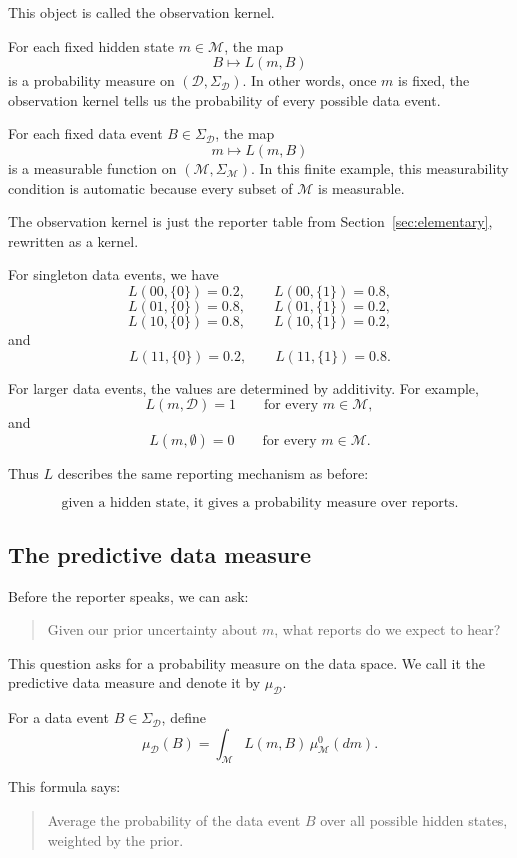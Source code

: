 \documentclass[11pt]{article}
\newcommand{\M}{\mathcal{M}}
\newcommand{\D}{\mathcal{D}}
\newcommand{\SigmaM}{\Sigma_{\M}}
\newcommand{\SigmaD}{\Sigma_{\D}}
\newcommand{\muMzero}{\mu^0_{\M}}
\newcommand{\muD}{\mu_{\D}}
\begin{document}
This object is called the observation kernel.

For each fixed hidden state \(m\in\M\), the map
\[
    B\longmapsto L(m,B)
\]
is a probability measure on \((\D,\SigmaD)\). In other words, once \(m\) is fixed, the observation kernel tells us the probability of every possible data event.

For each fixed data event \(B\in\SigmaD\), the map
\[
    m\longmapsto L(m,B)
\]
is a measurable function on \((\M,\SigmaM)\). In this finite example, this measurability condition is automatic because every subset of \(\M\) is measurable.

The observation kernel is just the reporter table from Section~\ref{sec:elementary}, rewritten as a kernel.

For singleton data events, we have
\[
    L(00,\{0\})=0.2,
    \qquad
    L(00,\{1\})=0.8,
\]
\[
    L(01,\{0\})=0.8,
    \qquad
    L(01,\{1\})=0.2,
\]
\[
    L(10,\{0\})=0.8,
    \qquad
    L(10,\{1\})=0.2,
\]
and
\[
    L(11,\{0\})=0.2,
    \qquad
    L(11,\{1\})=0.8.
\]

For larger data events, the values are determined by additivity. For example,
\[
    L(m,\D)=1
    \qquad
    \text{for every }m\in\M,
\]
and
\[
    L(m,\emptyset)=0
    \qquad
    \text{for every }m\in\M.
\]

Thus \(L\) describes the same reporting mechanism as before:

\[
    \text{given a hidden state, it gives a probability measure over reports.}
\]

\subsection{The predictive data measure}

Before the reporter speaks, we can ask:

\begin{quote}
    Given our prior uncertainty about \(m\), what reports do we expect to hear?
\end{quote}

This question asks for a probability measure on the data space. We call it the predictive data measure and denote it by \(\muD\).

For a data event \(B\in\SigmaD\), define
\[
    \muD(B)
    =
    \int_{\M} L(m,B)\,\muMzero(dm).
\]

This formula says:

\begin{quote}
    Average the probability of the data event \(B\) over all possible hidden states, weighted by the prior.
\end{quote}
\end{document}
